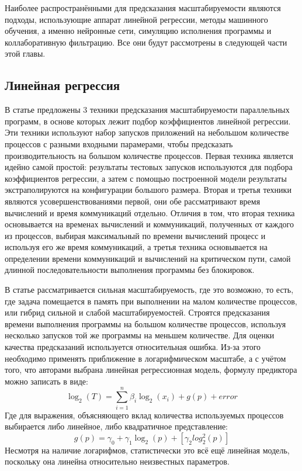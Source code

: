 	Наиболее распространёнными для предсказания масштабируемости являются подходы, использующие аппарат линейной регрессии, методы машинного обучения, а именно нейронные сети, симуляцию исполнения программы и коллаборативную фильтрацию. Все они будут рассмотрены в следующей части этой главы.

	\subsection{Линейная регрессия}
		В статье \cite{log_main} предложены 3 техники предсказания масштабируемости параллельных программ, в основе которых лежит подбор коэффициентов линейной регрессии. Эти техники используют набор запусков приложений на небольшом количестве процессов с разными входными парамерами, чтобы предсказать производительность на большом количестве процессов. Первая техника является идейно самой простой: результаты тестовых запусков используются для подбора коэффициентов регрессии, а затем с помощью построенной модели результаты экстраполируются на конфигурации большого размера. Вторая и третья техники являются усовершенствованиями первой, они обе рассматривают время вычислений и время коммуникаций отдельно. Отличия в том, что вторая техника основывается на временах вычислений и коммуникаций, полученных от каждого из процессов, выбирая максимальный по времени вычислений процесс и используя его же время коммуникаций, а третья техника основывается на определении времени коммуникаций и вычислений на критическом пути, самой длинной последовательности выполнения программы без блокировок.

		В статье рассматривается сильная масштабируемость, где это возможно, то есть, где задача помещается в память при выполнении на малом количестве процессов, или гибрид сильной и слабой масштабируемостей. Строятся предсказания времени выполнения программы на большом количестве процессов, используя несколько запусков той же программы на меньшем количестве. Для оценки качества предсказаний используется относительная ошибка. Из-за этого необходимо применять приближение в логарифмическом масштабе, а с учётом того, что авторами выбрана линейная регрессионная модель, формулу предиктора можно записать в виде:
		\[
		\log_2{(T)} = \sum_{i=1}^{n}{\beta_i\log_2{(x_i)}} + g(p) + error
		\]
		Где для выражения, объясняющего вклад количества используемых процессов выбирается либо линейное, либо квадратичное представление:
		\[
		g(p) = \gamma_0 + \gamma_1\log_2(p) + [\gamma_2log_2^2(p)]
		\]
		Несмотря на наличие логарифмов, статистически это всё ещё линейная модель, поскольку она линейна относительно неизвестных параметров.



